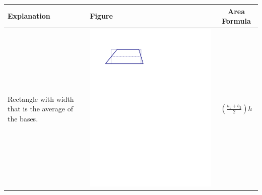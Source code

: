 \documentclass{ximera}
\begin{document}
%
%
\newpage
{\renewcommand{\arraystretch}{1.5}
\begin{tabular}{|>{\centering\arraybackslash}m{2.5cm}|>{\centering\arraybackslash}m{9.5cm}|c|}\hline
Explanation & Figure & Area Formula \\\hline

Rectangle with width that is the average of the bases. & \includegraphics[scale=0.7]{./graphics/trapezoid2.pdf} & $\left(\frac{b_1+b_2}{2}\right)h$ \\ \hline

\end{tabular}}
\end{document}

